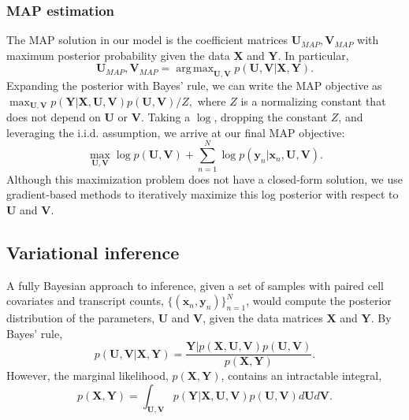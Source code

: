 \documentclass{bmcart}
\DeclareMathOperator*{\argmax}{arg\,max}
\begin{document}
\subsubsection*{MAP estimation}
The MAP solution in our model is the coefficient matrices $\mathbf{U}_{MAP}, \mathbf{V}_{MAP}$ with maximum posterior probability given the data $\mathbf{X}$ and $\mathbf{Y}$. In particular,
\[
\mathbf{U}_{MAP}, \mathbf{V}_{MAP} = \argmax_{\mathbf{U}, \mathbf{V}} p(\mathbf{U}, \mathbf{V} | \mathbf{X}, \mathbf{Y}).
\]
Expanding the posterior with Bayes' rule, we can write the MAP objective as $\max_{\mathbf{U}, \mathbf{V}} p(\mathbf{Y} | \mathbf{X}, \mathbf{U}, \mathbf{V}) p(\mathbf{U}, \mathbf{V}) / Z,$
where $Z$ is a normalizing constant that does not depend on $\mathbf{U}$ or $\mathbf{V}$. Taking a $\log$, dropping the constant $Z$, and leveraging the i.i.d. assumption, we arrive at our final MAP objective:
\[
\max_{\mathbf{U}, \mathbf{V}} \log p(\mathbf{U}, \mathbf{V}) + \sum\limits_{n=1}^N \log p(\mathbf{y}_n | \mathbf{x}_n, \mathbf{U}, \mathbf{V}).
\]
Although this maximization problem does not have a closed-form solution, we use gradient-based methods to iteratively maximize this log posterior with respect to $\mathbf{U}$ and $\mathbf{V}$.

\subsection*{Variational inference}
A fully Bayesian approach to inference, given a set of samples with paired cell covariates and transcript counts, $\{(\mathbf{x}_n, \mathbf{y}_n)\}_{n=1}^N$, would compute the posterior distribution of the parameters, $\mathbf{U}$ and $\mathbf{V}$, given the data matrices $\mathbf{X}$ and $\mathbf{Y}$. By Bayes' rule,
\begin{equation*}
    p(\mathbf{U}, \mathbf{V} | \mathbf{X}, \mathbf{Y}) = \frac{\mathbf{Y} | p(\mathbf{X}, \mathbf{U}, \mathbf{V}) p(\mathbf{U}, \mathbf{V})}{p(\mathbf{X}, \mathbf{Y})}.
\end{equation*}
However, the marginal likelihood, $p(\mathbf{X}, \mathbf{Y})$, contains an intractable integral,
\begin{equation}
    p(\mathbf{X}, \mathbf{Y})=\int_{\mathbf{U}, \mathbf{V}} p(\mathbf{Y} | \mathbf{X}, \mathbf{U}, \mathbf{V}) p(\mathbf{U}, \mathbf{V}) d\mathbf{U}d\mathbf{V}.
\end{equation}
\end{document}
